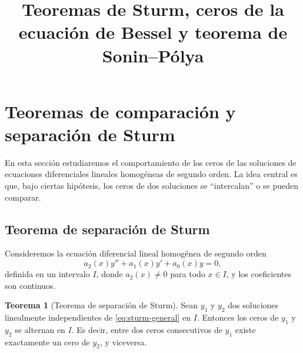 \documentclass[12pt,a4paper]{article}
\title{\textbf{Teoremas de Sturm, ceros de la ecuación de Bessel y teorema de Sonin--Pólya}}
\author{}
\date{}
\theoremstyle{definition}
\newtheorem{teorema}{Teorema}[section]
\begin{document}
\maketitle

\section{Teoremas de comparación y separación de Sturm}

En esta sección estudiaremos el comportamiento de los ceros de las soluciones de ecuaciones diferenciales lineales homogéneas de segundo orden. La idea central es que, bajo ciertas hipótesis, los ceros de dos soluciones se ``intercalan'' o se pueden comparar.

\subsection{Teorema de separación de Sturm}

Consideremos la ecuación diferencial lineal homogénea de segundo orden
\begin{equation}\label{eq:sturm-general}
a_2(x)y''+a_1(x)y'+a_0(x)y=0,
\end{equation}
definida en un intervalo \(I\), donde \(a_2(x)\neq 0\) para todo \(x\in I\), y los coeficientes son continuos.

\begin{teorema}[Teorema de separación de Sturm]
Sean \(y_1\) y \(y_2\) dos soluciones linealmente independientes de \eqref{eq:sturm-general} en \(I\). Entonces los ceros de \(y_1\) y \(y_2\) se alternan en \(I\). Es decir, entre dos ceros consecutivos de \(y_1\) existe exactamente un cero de \(y_2\), y viceversa.
\end{teorema}
\end{document}
